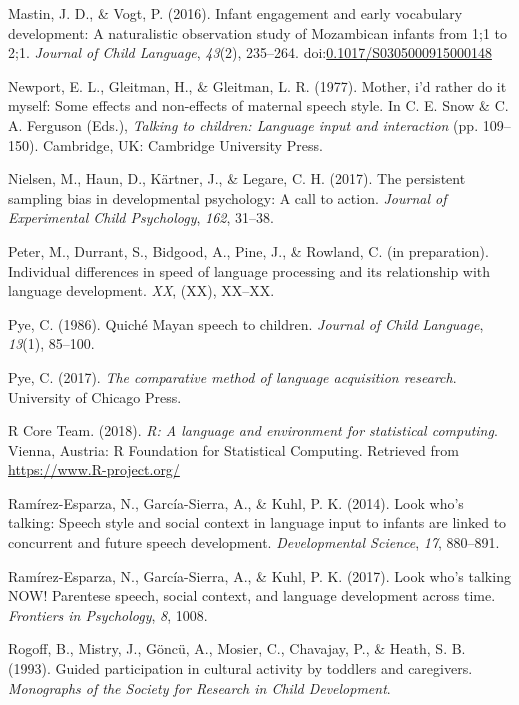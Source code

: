 \documentclass[floatsintext,man]{apa6}
\theoremstyle{definition}
\theoremstyle{definition}
\theoremstyle{definition}
\theoremstyle{remark}
\begin{document}
\hypertarget{ref-mastin2016infant}{}
Mastin, J. D., \& Vogt, P. (2016). Infant engagement and early
vocabulary development: A naturalistic observation study of Mozambican
infants from 1;1 to 2;1. \emph{Journal of Child Language}, \emph{43}(2),
235--264.
doi:\href{https://doi.org/0.1017/S0305000915000148}{0.1017/S0305000915000148}

\hypertarget{ref-newport1977mother}{}
Newport, E. L., Gleitman, H., \& Gleitman, L. R. (1977). Mother, i'd
rather do it myself: Some effects and non-effects of maternal speech
style. In C. E. Snow \& C. A. Ferguson (Eds.), \emph{Talking to
children: Language input and interaction} (pp. 109--150). Cambridge, UK:
Cambridge University Press.

\hypertarget{ref-nielsen2017persistent}{}
Nielsen, M., Haun, D., Kärtner, J., \& Legare, C. H. (2017). The
persistent sampling bias in developmental psychology: A call to action.
\emph{Journal of Experimental Child Psychology}, \emph{162}, 31--38.

\hypertarget{ref-peterIPindividual}{}
Peter, M., Durrant, S., Bidgood, A., Pine, J., \& Rowland, C. (in
preparation). Individual differences in speed of language processing and
its relationship with language development. \emph{XX}, (XX), XX--XX.

\hypertarget{ref-pye1986quiche}{}
Pye, C. (1986). Quiché Mayan speech to children. \emph{Journal of Child
Language}, \emph{13}(1), 85--100.

\hypertarget{ref-pye2017comparative}{}
Pye, C. (2017). \emph{The comparative method of language acquisition
research}. University of Chicago Press.

\hypertarget{ref-R-base}{}
R Core Team. (2018). \emph{R: A language and environment for statistical
computing}. Vienna, Austria: R Foundation for Statistical Computing.
Retrieved from \url{https://www.R-project.org/}

\hypertarget{ref-ramirezesparza2014look}{}
Ramírez-Esparza, N., García-Sierra, A., \& Kuhl, P. K. (2014). Look
who's talking: Speech style and social context in language input to
infants are linked to concurrent and future speech development.
\emph{Developmental Science}, \emph{17}, 880--891.

\hypertarget{ref-ramirezesparza2017look}{}
Ramírez-Esparza, N., García-Sierra, A., \& Kuhl, P. K. (2017). Look
who's talking NOW! Parentese speech, social context, and language
development across time. \emph{Frontiers in Psychology}, \emph{8}, 1008.

\hypertarget{ref-rogoff1993guided}{}
Rogoff, B., Mistry, J., Göncü, A., Mosier, C., Chavajay, P., \& Heath,
S. B. (1993). Guided participation in cultural activity by toddlers and
caregivers. \emph{Monographs of the Society for Research in Child
Development}.
\end{document}
